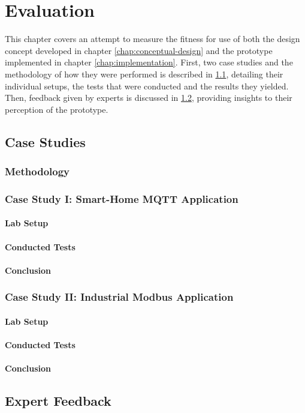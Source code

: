 \chapter{Evaluation}
\label{chap:evaluation}

This chapter covers an attempt to measure the fitness for use of both the design concept developed in chapter \ref{chap:conceptual-design} and the prototype implemented in chapter \ref{chap:implementation}. First, two case studies and the methodology of how they were performed is described in \ref{sec:case-studies}, detailing their individual setups, the tests that were conducted and the results they yielded. Then, feedback given by experts is discussed in \ref{sec:expert-feedback}, providing insights to their perception of the prototype.

\section{Case Studies}
\label{sec:case-studies}
\subsection{Methodology}
\label{sec:methodology}

\subsection{Case Study I: Smart-Home MQTT Application}
\label{sec:case-study-1}
\subsubsection{Lab Setup}
\subsubsection{Conducted Tests}
\subsubsection{Conclusion}

\subsection{Case Study II: Industrial Modbus Application}
\label{sec:case-study-2}
\subsubsection{Lab Setup}
\subsubsection{Conducted Tests}
\subsubsection{Conclusion}

\section{Expert Feedback}
\label{sec:expert-feedback}